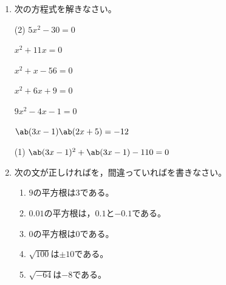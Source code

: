 \documentclass[titlepage,article,paper=b4,twocolumn]{jlreq}
\begin{document}
\begin{enumerate}[label=\arabic*.]
\begin{tasks}[resume,label=(\arabic*)](1)
\task $2\ab(\sqrt{3} + 3\sqrt{2}) - \ab(4\sqrt{3} - \sqrt{2})$
\vspace{5mm}
\end{tasks}
\vfill


\item 次の方程式を解きなさい。
\vspace{5mm}

\begin{tasks}[label=(\arabic*)](2)
\task $5{x}^{2} - 30 = 0$
\vspace{5mm}

\task ${x}^{2} + 11x = 0$
\vspace{5mm}

\task ${x}^{2} + x - 56 = 0$
\vspace{5mm}

\task ${x}^{2} + 6x + 9 = 0$
\vspace{5mm}

\task $9{x}^{2} - 4x - 1 = 0$
\vspace{5mm}

\task $\ab(3x - 1)\ab(2x + 5) = -12$
\vspace{5mm}
\end{tasks}

\begin{tasks}[resume,label=(\arabic*)](1)
\task $\ab(3x - 1)^{2} + \ab(3x - 1) - 110 = 0$
\vspace{5mm}
\end{tasks}
\vfill\vfill
\newpage


\item 次の文が正しければ{\maru}を，間違っていれば{\batsu}を書きなさい。
\begin{enumerate}[label=(\arabic*)]
\setlength{\labelsep}{\zw}
\item $9$の平方根は$3$である。
\vspace{5mm}
\item $0.01$の平方根は，$0.1$と$-0.1$である。
\vspace{5mm}
\item $0$の平方根は$0$である。
\vspace{5mm}
\item $\sqrt{100}$は$\pm 10$である。
\vspace{5mm}
\item $\sqrt{-64}$は$-8$である。
\vspace{5mm}
\end{enumerate}
\vfill



\end{enumerate}
\end{document}
